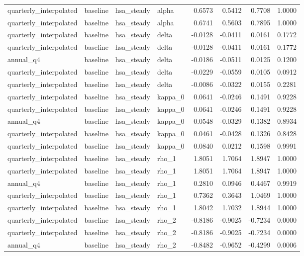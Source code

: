 \begin{tabular}{llllrrrr}
quarterly\_interpolated & baseline & hsa\_steady & alpha & 0.6573 & 0.5412 & 0.7708 & 1.0000 \\
quarterly\_interpolated & baseline & hsa\_steady & alpha & 0.6741 & 0.5603 & 0.7895 & 1.0000 \\
quarterly\_interpolated & baseline & hsa\_steady & delta & -0.0128 & -0.0411 & 0.0161 & 0.1772 \\
quarterly\_interpolated & baseline & hsa\_steady & delta & -0.0128 & -0.0411 & 0.0161 & 0.1772 \\
annual\_q4 & baseline & hsa\_steady & delta & -0.0186 & -0.0511 & 0.0125 & 0.1200 \\
quarterly\_interpolated & baseline & hsa\_steady & delta & -0.0229 & -0.0559 & 0.0105 & 0.0912 \\
quarterly\_interpolated & baseline & hsa\_steady & delta & -0.0086 & -0.0322 & 0.0155 & 0.2281 \\
quarterly\_interpolated & baseline & hsa\_steady & kappa\_0 & 0.0641 & -0.0246 & 0.1491 & 0.9228 \\
quarterly\_interpolated & baseline & hsa\_steady & kappa\_0 & 0.0641 & -0.0246 & 0.1491 & 0.9228 \\
annual\_q4 & baseline & hsa\_steady & kappa\_0 & 0.0548 & -0.0329 & 0.1382 & 0.8934 \\
quarterly\_interpolated & baseline & hsa\_steady & kappa\_0 & 0.0461 & -0.0428 & 0.1326 & 0.8428 \\
quarterly\_interpolated & baseline & hsa\_steady & kappa\_0 & 0.0840 & 0.0212 & 0.1598 & 0.9991 \\
quarterly\_interpolated & baseline & hsa\_steady & rho\_1 & 1.8051 & 1.7064 & 1.8947 & 1.0000 \\
quarterly\_interpolated & baseline & hsa\_steady & rho\_1 & 1.8051 & 1.7064 & 1.8947 & 1.0000 \\
annual\_q4 & baseline & hsa\_steady & rho\_1 & 0.2810 & 0.0946 & 0.4467 & 0.9919 \\
quarterly\_interpolated & baseline & hsa\_steady & rho\_1 & 0.7362 & 0.3643 & 1.0469 & 1.0000 \\
quarterly\_interpolated & baseline & hsa\_steady & rho\_1 & 1.8042 & 1.7032 & 1.8944 & 1.0000 \\
quarterly\_interpolated & baseline & hsa\_steady & rho\_2 & -0.8186 & -0.9025 & -0.7234 & 0.0000 \\
quarterly\_interpolated & baseline & hsa\_steady & rho\_2 & -0.8186 & -0.9025 & -0.7234 & 0.0000 \\
annual\_q4 & baseline & hsa\_steady & rho\_2 & -0.8482 & -0.9652 & -0.4299 & 0.0006 \\

\end{tabular}
